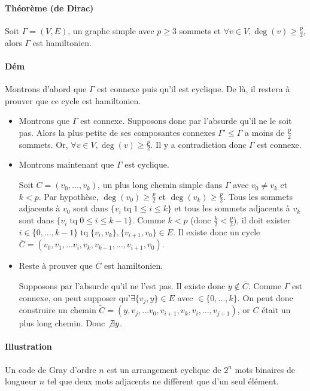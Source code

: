 \documentclass{article}
\DeclareMathOperator{\tq}{\text{ tq }}
\begin{document}
			\paragraph{Théorème (de Dirac)} Soit $\Gamma = (V, E)$, un graphe simple avec $p \geq 3$ sommets et $\forall v \in V, \deg(v) \geq \frac p2$, alors
			$\Gamma$ est hamiltonien.

			\paragraph{Dém} Montrons d'abord que $\Gamma$ est connexe puis qu'il est cyclique. De là, il restera à prouver que ce cycle est hamiltonien.
				\begin{itemize}
					\item Montrons que $\Gamma$ est connexe. Supposons donc par l'absurde qu'il ne le soit pas. Alors la plus petite de ses composantes
						  connexes $\Gamma' \leq \Gamma$ a moins de $\frac p2$ sommets. Or, $\forall v \in V, \deg(v) \geq \frac p2$. Il y a
						  contradiction donc $\Gamma$ est connexe.
					\item Montrons maintenant que $\Gamma$ est cyclique.

						  Soit $C = (v_0, \ldots, v_k)$, un plus long chemin simple dans $\Gamma$ avec $v_0 \neq v_k$ et $k < p$. Par hypothèse,
						  $\deg(v_0) \geq \frac p2$ et $\deg(v_k) \geq \frac p2$. Tous les sommets adjacents à $v_0$ sont dans
						  $\{v_i \tq 1 \leq i \leq k\}$ et tous les sommets adjacents à $v_k$ sont dans $\{v_i \tq 0 \leq i \leq k-1\}$. Comme
						  $k < p$ (donc $\frac k2 < \frac p2$), il doit exister $i \in \{0, \ldots, k-1\} \tq \{v_i, v_k\}, \{v_{i+1}, v_0\} \in E$.
						  Il existe donc un cycle $\overline C = (v_0, v_1, \ldots v_i, v_k, v_{k-1}, \ldots, v_{i+1}, v_0)$.
					\item Reste à prouver que $\overline C$ est hamiltonien.

						  Supposons par l'absurde qu'il ne l'est pas. Il existe donc $y \not \in \overline C$. Comme $\Gamma$ est connexe, on peut supposer
						  qu'$\exists \{v_j, y\} \in E$ avec $ \in \{0, \ldots, k\}$. On peut donc construire un chemin $\widetilde C = (y, v_j,
						  \ldots v_0, v_{i+1}, v_k, v_i, \ldots, v_{j+1})$, or $C$ était un plus long chemin. Donc $\not \exists y$.
				\end{itemize}

			\paragraph{Illustration} Un code de Gray d'ordre $n$ est un arrangement cyclique de $2^n$ mots binaires de longueur $n$ tel que deux
			mots adjacents ne diffèrent que d'un seul élément.
\end{document}
